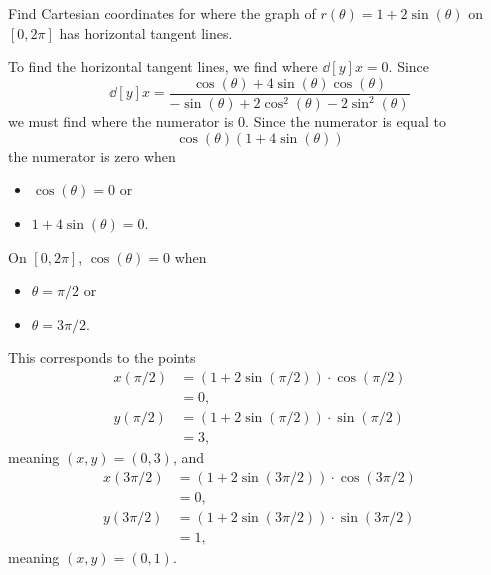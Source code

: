 \documentclass{ximera}
\begin{document}
\begin{example}
Find Cartesian coordinates for where the graph of $r(\theta)
=1+2\sin(\theta)$ on $[0,2\pi]$ has horizontal tangent lines.
\begin{explanation}
  To find the horizontal tangent lines, we find where $\dd[y]{x}=0$.
  Since
  \[
  \dd[y]{x} =\frac{\cos(\theta) + 4\sin(\theta)\cos(\theta)}{-\sin(\theta) + 2\cos^2(\theta)-2\sin^2(\theta)}
  \]
  we must find where the numerator is $0$. Since the numerator is equal to
  \[
  \cos(\theta)(1+ 4\sin(\theta))
  \]
  the numerator is zero when 
  \begin{itemize}
  \item $\cos(\theta)=0$ or
  \item $1+4\sin(\theta)=0$.
  \end{itemize}
  On $[0,2\pi]$, $\cos(\theta)=0$ when
  \begin{itemize}
  \item $\theta=\pi/2$ or
  \item $\theta= 3\pi/2$.
  \end{itemize}
  This corresponds to the points
  \begin{align*}
    x(\pi/2) &= \left(1+2\sin(\pi/2)\right)\cdot\cos(\pi/2)\\
    &= 0,\\
    y(\pi/2) &= \left(1+2\sin(\pi/2)\right)\cdot\sin(\pi/2)\\
    &= 3,
  \end{align*}
  meaning $(x,y) = (0,3)$, and
  \begin{align*}
    x(3\pi/2) &= \left(1+2\sin(3\pi/2)\right)\cdot\cos(3\pi/2)\\
    &= 0,\\
    y(3\pi/2) &= \left(1+2\sin(3\pi/2)\right)\cdot\sin(3\pi/2)\\
    &= 1,
  \end{align*}
  meaning $(x,y) = (0,1)$.
  

\end{explanation}
\end{example}
\end{document}
